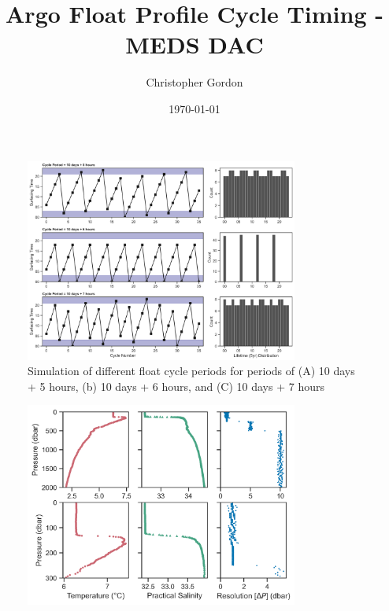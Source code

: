 \documentclass[11pt]{article}
\title{Argo Float Profile Cycle Timing - MEDS DAC}
\author{Christopher Gordon}
\date{\today}
\begin{document}
	\maketitle

    \begin{figure}[ht]
        \centering
        \includegraphics[width=0.8\textwidth]{../figures/profile_time_of_day_1yr_7hr_added.png}
        \caption{Simulation of different float cycle periods for periods of (A) 10 days + 5 hours, (b) 10 days + 6 hours, and (C) 10 days + 7 hours}
    \end{figure}


    \begin{figure}[ht]
        \centering
        \includegraphics[width=0.8\textwidth]{../figures/meds_high_res_results.png}
        \caption{}
    \end{figure}
\end{document}
